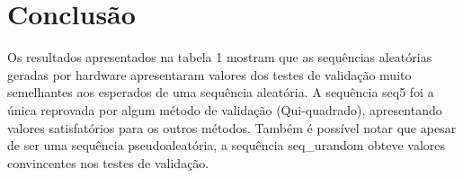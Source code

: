 \section{Conclusão}

Os resultados apresentados na tabela 1 mostram que as sequências aleatórias geradas por hardware apresentaram valores dos testes de validação muito semelhantes aos esperados de uma sequência aleatória. A sequência seq5 foi a única reprovada por
algum método de validação (Qui-quadrado), apresentando valores satisfatórios para os outros métodos. Também é possível notar que apesar de ser uma sequência pseudoaleatória, a sequência seq\_urandom obteve valores convincentes nos testes de validação.